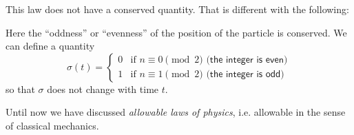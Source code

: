\documentclass[pagesize,headsepline,10pt,parskip=half]{scrreprt}
\begin{document}
        This law does not have a conserved quantity.  That is different with the
        following:
        \begin{center}
        \end{center}
        Here the ``oddness'' or ``evenness'' of the position of the particle is
        conserved.  We can define a quantity
        \[\sigma(t) = \begin{cases}
          0 & \textrm{if } n \equiv 0 \pmod 2 \textsf{ (the integer is even)} \\
          1 & \textrm{if } n \equiv 1 \pmod 2 \textsf{ (the integer is odd)}
        \end{cases}\]
        so that $\sigma$ does not change with time $t$.

        Until now we have discussed \emph{allowable laws of physics}, i.e.
        allowable in the sense of classical mechanics.
\end{document}
